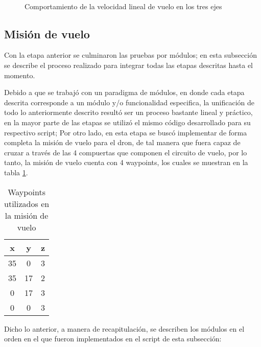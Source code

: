 \begin{figure}[ht]
    \centering
    \hfill
    \\
    \hfill

    \caption{Comportamiento de la velocidad lineal de vuelo en los tres ejes}
    \label{fig:pymav_movementv}
\end{figure}


\subsection{Misión de vuelo}

Con la etapa anterior se culminaron las pruebas por módulos; en esta subsección se describe el proceso realizado para integrar todas las etapas descritas hasta el momento.

Debido a que se trabajó con un paradigma de módulos, en donde cada etapa descrita corresponde a un módulo y/o funcionalidad especifica, la unificación de todo lo anteriormente descrito resultó ser un proceso bastante lineal y práctico, en la mayor parte de las etapas se utilizó el mismo código desarrollado para su respectivo script; Por otro lado, en esta etapa se buscó implementar de forma completa la misión de vuelo para el dron, de tal manera que fuera capaz de cruzar a través de las 4 compuertas que componen el circuito de vuelo, por lo tanto, la misión de vuelo cuenta con 4 waypoints, los cuales se muestran en la tabla \ref{tab:waypoints_mission}.

\begin{table}[ht]
    \centering
    \begin{tabular}{ccc}
        \hline
        x & y & z\\
        \hline
        35 & 0 & 3\\
        35 & 17 & 2\\
        0 & 17 & 3\\
        0 & 0 & 3\\
        \hline
    \end{tabular}
    \caption{Waypoints utilizados en la misión de vuelo}
    \label{tab:waypoints_mission}
\end{table}


Dicho lo anterior, a manera de recapitulación, se describen los módulos en el orden en el que fueron implementados en el script de esta subsección:


